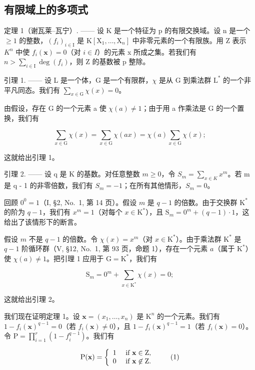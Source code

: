 \subsection{有限域上的多项式}

定理 1（谢瓦莱–瓦宁）. —— 设 K 是一个特征为 p 的有限交换域。设 n 是一个 \(\geqslant 1\) 的整数，\((f_{i})_{i\in\mathrm{I}}\) 是 \(\mathrm{K}[\mathrm{X}_{1},\ldots,\mathrm{X}_{n}]\) 中非零元素的一个有限族。用 Z 表示 \(K^{n}\) 中使 \(f_{i}(\mathbf{x})=0\)（对 \(i\in I\)）的元素 x 所成之集。若我们有 \(n>\sum_{i\in\mathrm{I}}\deg(f_{i})\)，则 Z 的基数被 p 整除。

引理 1. —— 设 L 是一个体，G 是一个有限群，\(\chi\) 是从 G 到乘法群 \(\mathrm{L}^*\) 的一个非平凡同态。我们有 \(\sum_{x\in \mathrm{G}}\chi (x) = 0\)。

由假设，存在 G 的一个元素 a 使 \(\chi(a) \neq 1\)；由于用 a 作乘法是 G 的一个置换，我们有

\[
\sum_ {x \in \mathrm{G}} \chi (x) = \sum_ {x \in \mathrm{G}} \chi (a x) = \chi (a) \sum_ {x \in \mathrm{G}} \chi (x);
\]

这就给出引理 1。

引理 2. —— 设 q 是 K 的基数。对任意整数 \(m \geqslant 0\)，令 \(S_{m} = \sum_{x \in K} x^{m}\)。若 m 是 q - 1 的非零倍数，我们有 \(S_{m} = -1\)；在所有其他情形，\(S_{m} = 0\)。

回顾 \(0^0 = 1\)（I, §2, No.~1, 第 14 页）。假设 \(m\) 是 \(q - 1\) 的倍数。由于交换群 \(\mathrm{K}^*\) 的阶为 \(q - 1\)，我们有 \(x^m = 1\)（对每个 \(x \in \mathrm{K}^*\)），且 \(\mathrm{S}_m = 0^m + (q - 1) \cdot 1\)，这给出了该情形下的断言。

假设 \(m\) 不是 \(q - 1\) 的倍数。令 \(\chi(x) = x^m\)（对 \(x \in \mathrm{K}^*\)）。由于乘法群 \(\mathrm{K}^*\) 是 \(q - 1\) 阶循环群（V, §12, No.~1, 第 93 页，命题 1），存在一个元素 \(a\)（属于 \(\mathrm{K}^*\)）使 \(\chi(a) \neq 1\)。把引理 1 应用于 \(\mathrm{G} = \mathrm{K}^*\)，我们有

\[
\mathrm{S} _ {m} = 0 ^ {m} + \sum_ {x \in \mathrm{K} ^ {*}} \chi (x) = 0;
\]

这就给出引理 2。

我们现在证明定理 1。设 \(\mathbf{x} = (x_1, \ldots, x_n)\) 是 \(\mathrm{K}^n\) 的一个元素。我们有 \(1 - f_i(\mathbf{x})^{q-1} = 0\)（若 \(f_i(\mathbf{x}) \neq 0\)），且 \(1 - f_i(\mathbf{x})^{q-1} = 1\)（若 \(f_i(\mathbf{x}) = 0\)）。令 \(\mathrm{P} = \prod_{i=1}^{r}(1 - f_i^{q-1})\)。我们有

\[
\mathrm{P} (\mathbf {x}) = \left\{ \begin{array}{l l} 1 & \text { if } \mathbf {x} \in \mathrm{Z}, \\ 0 & \text { if } \mathbf {x} \not \in \mathrm{Z}. \end{array} \right.\tag{1}
\]


